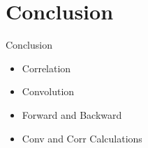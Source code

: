 \documentclass[aspectratio=1610,xcolor={dvipsnames},hyperref={colorlinks,unicode,linkcolor=violet,anchorcolor=BlueViolet,citecolor=YellowOrange,filecolor=black,urlcolor=Aquamarine}]{beamer}
\begin{document}
\section{Conclusion}
\label{sec:org8df8258}

\begin{frame}[label={sec:orgc0b68ce}]{Conclusion}
\begin{itemize}
\item Correlation
\item Convolution
\item Forward and Backward
\item Conv and Corr Calculations
\end{itemize}
\end{frame}
\end{document}
